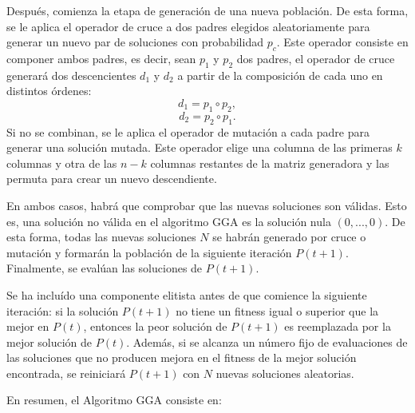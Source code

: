 Después, comienza la etapa de generación de una nueva población. De esta forma, se le aplica el operador de cruce a dos padres elegidos aleatoriamente para generar un nuevo par de soluciones con probabilidad $p_c$. Este operador consiste en componer ambos padres, es decir, sean $p_1$ y $p_2$ dos padres, el operador de cruce generará dos descencientes $d_1$ y $d_2$ a partir de la composición de cada uno en distintos órdenes:
\[
    d_1 = p_1 \circ p_2,
\]
\[
    d_2 = p_2 \circ p_1.
\]
Si no se combinan, se le aplica el operador de mutación a cada padre para generar una solución mutada. Este operador elige una columna de las primeras $k$ columnas y otra de las $n-k$ columnas restantes de la matriz generadora y las permuta para crear un nuevo descendiente.

En ambos casos, habrá que comprobar que las nuevas soluciones son válidas. Esto es, una solución no válida en el algoritmo GGA es la solución nula $(0,...,0)$. De esta forma, todas las nuevas soluciones $N$ se habrán generado por cruce o mutación y formarán la población de la siguiente iteración $P(t+1)$. Finalmente, se evalúan las soluciones de $P(t+1)$.

Se ha incluído una componente elitista antes de que comience la siguiente iteración: si la solución $P(t+1)$ no tiene un fitness igual o superior que la mejor en $P(t)$, entonces la peor solución de $P(t+1)$ es reemplazada por la mejor solución de $P(t)$. Además, si se alcanza un número fijo de evaluaciones de las soluciones que no producen mejora en el fitness de la mejor solución encontrada, se reiniciará $P(t+1)$ con $N$ nuevas soluciones aleatorias.

En resumen, el Algoritmo GGA consiste en:

